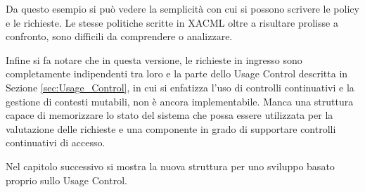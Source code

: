 Da questo esempio si può vedere la semplicità con cui si possono scrivere le policy e le richieste.
Le stesse politiche scritte in \ac{XACML} oltre a risultare prolisse a confronto, sono difficili da comprendere o analizzare.\par
Infine si fa notare che in questa versione, le richieste in ingresso sono completamente indipendenti tra loro e
la parte dello Usage Control descritta in Sezione \ref{sec:Usage_Control}, in cui si enfatizza l'uso di controlli continuativi e
la gestione di contesti mutabili, non è ancora implementabile. Manca una struttura capace di memorizzare lo stato del
sistema che possa essere utilizzata per la valutazione delle richieste e una componente in grado di supportare
controlli continuativi di accesso.\par
Nel capitolo successivo si mostra la nuova struttura per uno sviluppo basato proprio sullo Usage Control.
